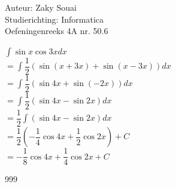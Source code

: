 \documentclass[a4paper]{article}
\begin{document}
  
\noindent \large Auteur: Zaky Souai \\
\noindent \large Studierichting:  Informatica\\
\noindent \large Oefeningenreeks 4A nr. 50.6\\

\bigskip

\normalsize

$ \displaystyle\int \sin x \cos 3xdx $\\

$ = \displaystyle\int \dfrac{1}{2} \left(\sin (x + 3x) + \sin (x - 3x) \right) dx $\\

$ = \displaystyle\int \dfrac{1}{2} \left(\sin 4x + \sin (-2x) \right) dx $\\

$ = \displaystyle\int \dfrac{1}{2} \left(\sin 4x - \sin 2x \right) dx $\\

$ = \dfrac{1}{2} \displaystyle\int \left(\sin 4x - \sin 2x \right) dx $\\

$ = \dfrac{1}{2} \left(-\dfrac{1}{4} \cos 4x + \dfrac{1}{2} \cos 2x \right) + C $\\

$ = -\dfrac{1}{8} \cos 4x + \dfrac{1}{4} \cos 2x + C $


\begin{thebibliography}{999}
\end{thebibliography}
\end{document}
